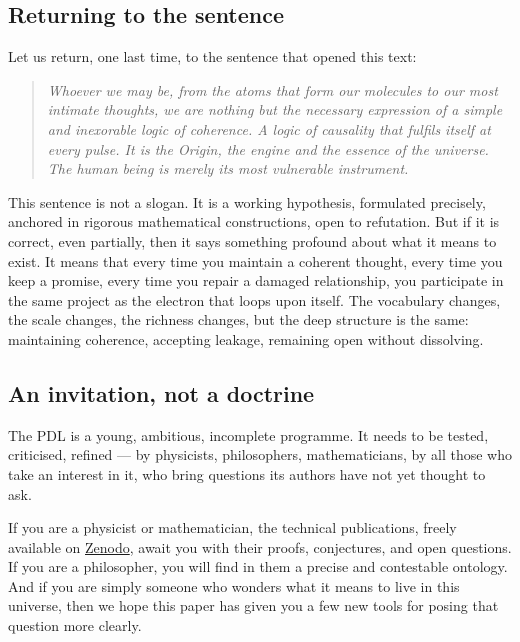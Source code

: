 \documentclass[11pt, a4paper, openright]{book}
\begin{document}
\subsection*{Returning to the sentence}

Let us return, one last time, to the sentence that opened this text:

\begin{quote}
\itshape Whoever we may be, from the atoms that form our molecules to our most intimate thoughts, we are nothing but the necessary expression of a simple and inexorable logic of coherence. A logic of causality that fulfils itself at every pulse. It is the Origin, the engine and the essence of the universe. The human being is merely its most vulnerable instrument.
\end{quote}

This sentence is not a slogan. It is a working hypothesis, formulated precisely, anchored in rigorous mathematical constructions, open to refutation. But if it is correct, even partially, then it says something profound about what it means to exist. It means that every time you maintain a coherent thought, every time you keep a promise, every time you repair a damaged relationship, you participate in the same project as the electron that loops upon itself. The vocabulary changes, the scale changes, the richness changes, but the deep structure is the same: maintaining coherence, accepting leakage, remaining open without dissolving.

\subsection*{An invitation, not a doctrine}

The PDL is a young, ambitious, incomplete programme. It needs to be tested, criticised, refined — by physicists, philosophers, mathematicians, by all those who take an interest in it, who bring questions its authors have not yet thought to ask.

\medskip

If you are a physicist or mathematician, the technical publications, freely available on \href{https://zenodo.org}{Zenodo}, await you with their proofs, conjectures, and open questions. If you are a philosopher, you will find in them a precise and contestable ontology. And if you are simply someone who wonders what it means to live in this universe, then we hope this paper has given you a few new tools for posing that question more clearly.
\end{document}

